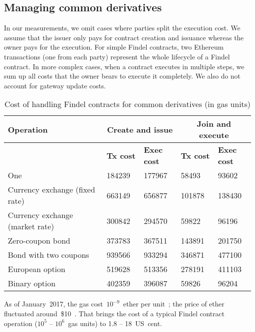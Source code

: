 \subsection{Managing common derivatives}

In our measurements, we omit cases where parties split the execution cost.
We assume that the issuer only pays for contract creation and issuance whereas the owner pays for the execution.
For simple Findel contracts, two Ethereum transactions (one from each party) represent the whole lifecycle of a Findel contract.
In more complex cases, when a contract executes in multiple steps, we sum up all costs that the owner bears to execute it completely.
We also do not account for gateway update costs.

\begin{table}
	\centering
	\begin{tabular}{|p{0.4\linewidth}|p{0.15\linewidth}|p{0.15\linewidth}|p{0.15\linewidth}|p{0.15\linewidth}|}
		\hline
		\textbf{Operation} & \multicolumn{2}{|c|}{\textbf{Create and issue}} & \multicolumn{2}{|c|}{\textbf{Join and execute}}\\
		\hline
		& \textbf{Tx cost} & \textbf{Exec cost} & \textbf{Tx cost} & \textbf{Exec cost} \\
		\hline
		One & 184239 & 177967 & 58493 & 93602 \\
		\hline
		Currency exchange (fixed rate) & 663149 & 656877 & 101878 & 138430 \\
		\hline
		Currency exchange (market rate) & 300842 & 294570 & 59822 & 96196 \\
		\hline
		Zero-coupon bond & 373783 & 367511 & 143891 & 201750 \\
		\hline
		Bond with two coupons & 939566 & 933294 & 346871 & 477100 \\
		\hline
		European option & 519628 & 513356 & 278191 & 411103 \\
		\hline
		Binary option & 402359 & 396087 & 59826 & 96204 \\
		\hline
	\end{tabular}
	\caption{Cost of handling Findel contracts for common derivatives (in gas units)}
	\label{tab:Ch10FindelCost2}
\end{table}

As of January~2017, the gas cost~$10^{-9}$~ether per unit~\cite{Ethstats}; the price of ether fluctuated around~\$10~\cite{Worldcoinindex}.
That brings the cost of a typical Findel contract operation ($10^5$ -- $10^6$~gas units) to 1.8 -- 18~US~cent.


